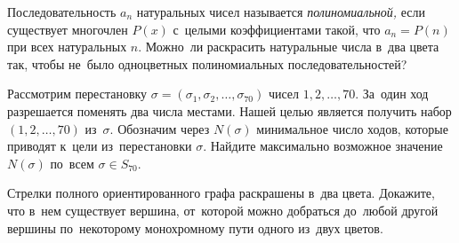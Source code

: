 


\begin{problems}


\item
Последовательность $a_{n}$ натуральных чисел называется \emph{полиномиальной,}
если существует многочлен $P(x)$ с~целыми коэффициентами такой, что
$a_{n} = P(n)$ при всех натуральных $n$.
Можно~ли раскрасить натуральные числа в~два цвета так, чтобы не~было
одноцветных полиномиальных последовательностей?

\item
Рассмотрим перестановку
$\sigma = (\sigma_{1}, \sigma_{2}, \ldots, \sigma_{70})$
чисел $1, 2, \ldots, 70$.
За~один ход разрешается поменять два числа местами.
Нашей целью является получить набор $(1, 2, \ldots, 70)$
из~$\sigma$.
Обозначим через $N({\sigma})$ минимальное число ходов, которые приводят к~цели
из~перестановки $\sigma$.
Найдите максимально возможное значение $N({\sigma})$ по~всем
$\sigma \in S_{70}$.


\item
Стрелки полного ориентированного графа раскрашены в~два цвета.
Докажите, что в~нем существует вершина, от~которой можно добраться до~любой
другой вершины по~некоторому монохромному пути одного из~двух цветов.


\end{problems}


